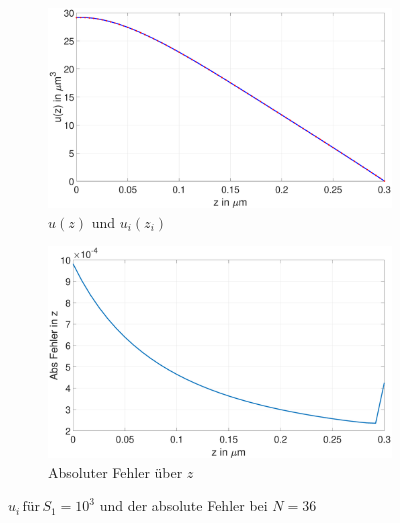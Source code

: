 \begin{figure}[h]
	\begin{subfigure}[b]{0.5\textwidth}
		\includegraphics[width=\textwidth]{figures/station_gl_2_1/S1}
		\caption{$u(z)$ und $u_{i}(z_i)$}
	\end{subfigure}
	\hfill
	\begin{subfigure}[b]{0.5\textwidth}
		\includegraphics[width=1\linewidth]{figures/station_gl_2_1/S1_fehler}
		\caption{Absoluter Fehler über $z$}
	\end{subfigure}
	\caption{$u_i \,\text{für} \, S_1=10^3$ und der absolute Fehler bei $N=36$ }
\end{figure}
\clearpage
